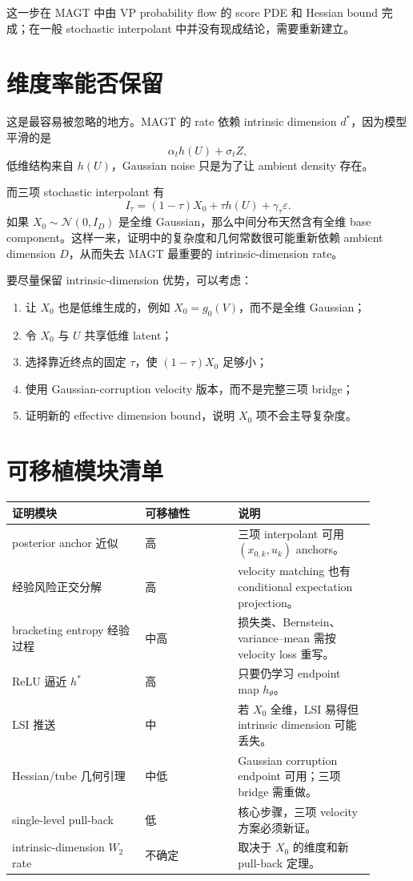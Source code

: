 \documentclass[UTF8,11pt]{ctexart}
\newcommand{\cN}{\mathcal{N}}
\begin{document}
这一步在 MAGT 中由 VP probability flow 的 score PDE 和 Hessian bound 完成；在一般 stochastic interpolant 中并没有现成结论，需要重新建立。

\section{维度率能否保留}

这是最容易被忽略的地方。MAGT 的 rate 依赖 intrinsic dimension \(d^*\)，因为模型平滑的是
\[
\alpha_t h(U)+\sigma_tZ,
\]
低维结构来自 \(h(U)\)，Gaussian noise 只是为了让 ambient density 存在。

而三项 stochastic interpolant 有
\[
I_\tau=(1-\tau)X_0+\tau h(U)+\gamma_\tau\varepsilon.
\]
如果 \(X_0\sim\cN(0,I_D)\) 是全维 Gaussian，那么中间分布天然含有全维 base component。这样一来，证明中的复杂度和几何常数很可能重新依赖 ambient dimension \(D\)，从而失去 MAGT 最重要的 intrinsic-dimension rate。

要尽量保留 intrinsic-dimension 优势，可以考虑：
\begin{enumerate}
\item 让 \(X_0\) 也是低维生成的，例如 \(X_0=g_0(V)\)，而不是全维 Gaussian；
\item 令 \(X_0\) 与 \(U\) 共享低维 latent；
\item 选择靠近终点的固定 \(\tau\)，使 \((1-\tau)X_0\) 足够小；
\item 使用 Gaussian-corruption velocity 版本，而不是完整三项 bridge；
\item 证明新的 effective dimension bound，说明 \(X_0\) 项不会主导复杂度。
\end{enumerate}

\section{可移植模块清单}

\begin{center}
\begin{tabular}{p{0.33\linewidth}p{0.23\linewidth}p{0.34\linewidth}}
\toprule
证明模块 & 可移植性 & 说明 \\
\midrule
posterior anchor 近似 & 高 & 三项 interpolant 可用 \((x_{0,k},u_k)\) anchors。\\
经验风险正交分解 & 高 & velocity matching 也有 conditional expectation projection。\\
bracketing entropy 经验过程 & 中高 & 损失类、Bernstein、variance--mean 需按 velocity loss 重写。\\
ReLU 逼近 \(h^*\) & 高 & 只要仍学习 endpoint map \(h_\theta\)。\\
LSI 推送 & 中 & 若 \(X_0\) 全维，LSI 易得但 intrinsic dimension 可能丢失。\\
Hessian/tube 几何引理 & 中低 & Gaussian corruption endpoint 可用；三项 bridge 需重做。\\
single-level pull-back & 低 & 核心步骤，三项 velocity 方案必须新证。\\
intrinsic-dimension \(W_2\) rate & 不确定 & 取决于 \(X_0\) 的维度和新 pull-back 定理。\\
\bottomrule
\end{tabular}
\end{center}
\end{document}
